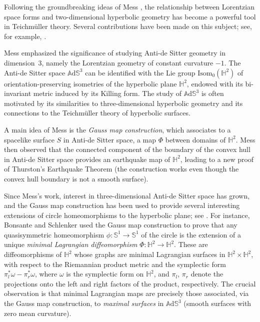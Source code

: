 \documentclass[JEP,XML,SOM,Unicode,NoEqCountersInSection, NoFloatCountersInSection,published]{cedram}
\theoremstyle{plain}
\theoremstyle{definition}
\newcommand{\ads}{\mathbb{A}\mathrm{d}\mathbb{S}^3}
\begin{document}
Following the groundbreaking ideas of Mess \cite{Mess}, the relationship between Lorentzian space forms and two-dimensional hyperbolic geometry has become a powerful tool in Teichmüller theory. Several contributions have been made on this subject; see, for example, \cite{Note_on_paper_mess,flatspacetimes_bonsante,Barbot_flatspacetime,canorot,BS_flat_conical}.

Mess emphasized the significance of studying Anti-de Sitter geometry in dimension~$3$, namely the Lorentzian geometry of constant curvature $-1$. The Anti-de Sitter space $\ads$ can be identified with the Lie group \(\text{Isom}_0(\mathbb{H}^2)\) of orientation-preserving isometries of the hyperbolic plane \(\mathbb{H}^2\), endowed with its bi-invariant metric induced by its Killing form. The study of $\ads$ is often motivated by its similarities to three-dimensional hyperbolic geometry and its connections to the Teichmüller theory of hyperbolic surfaces.

A main idea of Mess is the \emph{Gauss map construction}, which associates to a spacelike surface \(S\) in Anti-de Sitter space, a map \(\Phi\) between domains of \(\mathbb{H}^2\). Mess then observed that the connected component of the boundary of the convex hull in Anti-de Sitter space provides an earthquake map of \(\mathbb{H}^2\), leading to a new proof of Thurston's Earthquake Theorem \cite{Thurston} (the construction works even though the convex hull boundary is not a smooth surface).

Since Mess's work, interest in three-dimensional Anti-de Sitter space has grown, and the Gauss map construction has been used to provide several interesting extensions of circle homeomorphisms to the hyperbolic plane; see \cite{Maximalsurface, Areapreserving, SEP19}. For instance, Bonsante and Schlenker used the Gauss map construction to prove that any quasisymmetric homeomorphism \(\phi:\mathbb{S}^1 \to \mathbb{S}^1\) of the circle is the extension of a unique \emph{minimal Lagrangian diffeomorphism} \(\Phi:\mathbb{H}^2 \to \mathbb{H}^2\). These are diffeomorphisms of \(\mathbb{H}^2\) whose graphs are minimal Lagrangian surfaces in \(\mathbb{H}^2 \times \mathbb{H}^2\), with respect to the Riemannian product metric and the symplectic form \(\pi_l^* \omega - \pi_r^* \omega\), where \(\omega\) is the symplectic form on \(\mathbb{H}^2\), and \(\pi_l\), \(\pi_r\) denote the projections onto the left and right factors of the product, respectively.
The crucial observation is that minimal Lagrangian maps are precisely those associated, via the Gauss map construction, to \emph{maximal surfaces} in $\ads$ (\ie smooth surfaces with zero mean curvature).
\end{document}
